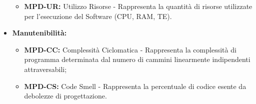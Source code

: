 \documentclass[8pt]{article}
\newcommand{\signatureline}[1]{%
	 \par\vspace{0.5cm}
	\noindent\makebox[\linewidth][r]{\rule{0.2\textwidth}{0.5pt}\hspace{3cm}\makebox[0pt][r]{\vspace{3pt}\footnotesize #1}}%
}
\begin{document}
\begin{itemize}
\begin{itemize}
            \item \textbf{MPD-UR:} Utilizzo Risorse - Rappresenta la quantità di risorse utilizzate per l'esecuzione del Software (CPU, RAM, TE).
        \end{itemize}
    \item \textbf{Manutenibilità:}
        \begin{itemize}
            \item \textbf{MPD-CC:} Complessità Ciclomatica - Rappresenta la complessità di programma determinata dal numero di cammini linearmente indipendenti attraversabili;
            \item \textbf{MPD-CS:} Code Smell - Rappresenta la percentuale di codice esente da debolezze di progettazione.
        \end{itemize}
\end{itemize}

\end{document}

